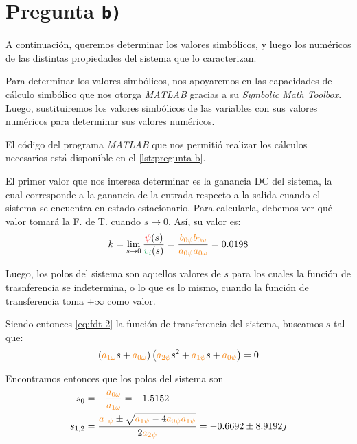 \section{Pregunta \texttt{b)}}\label{pregunta-b}

A continuación, queremos determinar los valores simbólicos, y luego los
numéricos de las distintas propiedades del sistema que lo caracterizan.

Para determinar los valores simbólicos, nos apoyaremos en las capacidades
de cálculo simbólico que nos otorga \textit{MATLAB} gracias a su
\textit{Symbolic Math Toolbox}. Luego, sustituiremos los valores simbólicos de
las variables con sus valores numéricos para determinar sus valores numéricos.

El código del programa \textit{MATLAB} que nos permitió realizar los cálculos
necesarios está disponible en el \autoref{lst:pregunta-b}.

El primer valor que nos interesa determinar es la ganancia DC del sistema, la
cual corresponde a la ganancia de la entrada respecto a la salida cuando el
sistema se encuentra en estado estacionario. Para calcularla, debemos ver qué
valor tomará la F. de T. cuando $s \to 0$. Así, su valor es:
\begin{equation}\label{eq:gdc}
  k = \lim_{s \to 0} \frac{\rojo{\psi}(s)}{\verd{v_{i}}(s)} =
    \frac{\nara{b_{0\psi}b_{0\omega}}}{\nara{a_{0\psi}a_{0\omega}}} = 0.0198
\end{equation}

Luego, los polos del sistema son aquellos valores de $s$ para los cuales la
función de trasnferencia se indetermina, o lo que es lo mismo, cuando la
función de transferencia toma $\pm\infty$ como valor.

Siendo entonces \eqref{eq:fdt-2} la función de transferencia del sistema,
buscamos $s$ tal que:
\begin{equation}
  \left(\nara{a_{1\omega}}s + \nara{a_{0\omega}}\right)\left(\nara{a_{2\psi}}s^{2} + \nara{a_{1\psi}}s + \nara{a_{0\psi}}\right) = 0
\end{equation}

Encontramos entonces que los polos del sistema son
\begin{align}
  s_{0} &= -\frac{\nara{a_{0\omega}}}{\nara{a_{1\omega}}} = -1.5152 \\
  s_{1,2} &= \frac{\nara{a_{1\psi}} \pm \sqrt{\nara{a_{1\psi}} - 4 \nara{a_{0\psi}a_{1\psi}}}}{2\nara{a_{2\psi}}} = -0.6692 \pm 8.9192j
\end{align}

